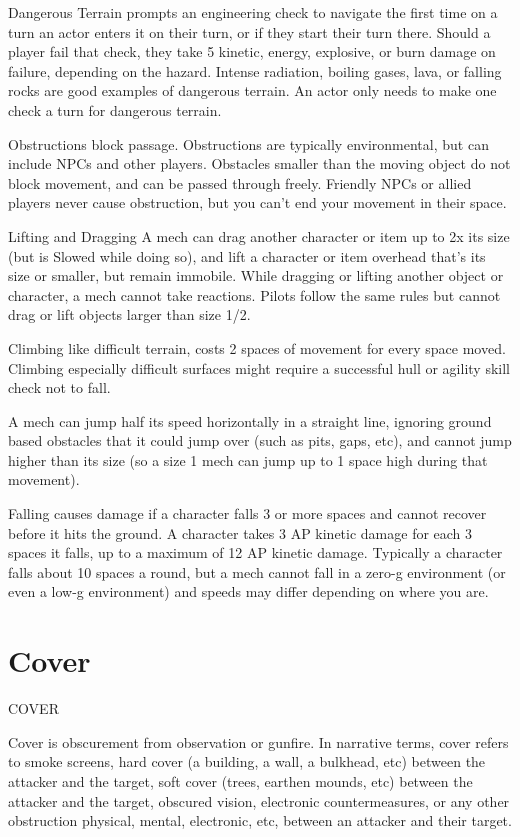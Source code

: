 Dangerous Terrain prompts an engineering check to navigate the first time on a turn an actor  
enters it on their turn, or if they start their turn there. Should a player fail that check, they take 5  
kinetic, energy, explosive, or burn damage on failure, depending on the hazard. Intense radiation,  
boiling gases, lava, or falling rocks are good examples of dangerous terrain. An actor only needs  
to make one check a turn for dangerous terrain.
 

Obstructions block passage. Obstructions are typically environmental, but can include NPCs  
and other players. Obstacles smaller than the moving object do not block movement, and  
can be passed through freely. Friendly NPCs or allied players never cause obstruction, but  
you can’t end your movement in their space.
 

Lifting and  Dragging  
A mech can drag another character or item up to 2x its size (but is Slowed while doing so), and  
lift a character or item overhead that’s its size or smaller, but remain immobile. While dragging or  
lifting another object or character, a mech cannot take reactions. Pilots follow the same rules but  
cannot drag or lift objects larger than size 1/2.
 

Climbing like difficult terrain, costs 2 spaces of movement for every space moved. Climbing  
especially difficult surfaces might require a successful hull or agility skill check not to fall.
 

A mech can jump half its speed horizontally in a straight line, ignoring ground based obstacles  
that it could jump over (such as pits, gaps, etc), and cannot jump higher than its size (so a size 1  
mech can jump up to 1 space high during that movement).
 
 
 
Falling causes damage if a character falls 3 or more spaces and cannot recover before it hits the  
ground. A character takes 3 AP kinetic damage for each 3 spaces it falls, up to a maximum of 12  
AP kinetic damage. Typically a character falls about 10 spaces a round, but a mech cannot fall in  
a zero-g environment (or even a low-g environment) and speeds may differ depending on where  
you are.
 
\section{Cover}
                                                     COVER  

Cover is obscurement from observation or gunfire. In narrative terms, cover refers to smoke  
screens, hard cover (a building, a wall, a bulkhead, etc) between the attacker and the target, soft  
cover (trees, earthen mounds, etc) between the attacker and the target, obscured vision,  
electronic countermeasures, or any other obstruction physical, mental, electronic, etc, between an  
attacker and their target.  

